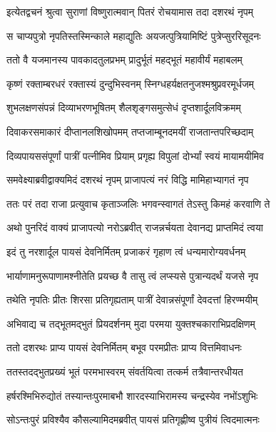 \twolineshloka
{इत्येतद्वचनं श्रुत्वा सुराणां विष्णुरात्मवान्}
{पितरं रोचयामास तदा दशरथं नृपम्} %

\twolineshloka
{स चाप्यपुत्रो नृपतिस्तस्मिन्काले महाद्युतिः}
{अयजत्पुत्रियामिष्टिं पुत्रेप्सुररिसूदनः} %

\twolineshloka
{ततो वै यजमानस्य पावकादतुलप्रभम्}
{प्रादुर्भूतं महद्भूतं महावीर्यं महाबलम्} %

\twolineshloka
{कृष्णं रक्ताम्बरधरं रक्तास्यं दुन्दुभिस्वनम्}
{स्निग्धहर्यक्षतनुजश्मश्रुप्रवरमूर्धजम्} %

\twolineshloka
{शुभलक्षणसंपन्नं दिव्याभरणभूषितम्}
{शैलशृङ्गसमुत्सेधं दृप्तशार्दूलविक्रमम्} %

\twolineshloka
{दिवाकरसमाकारं दीप्तानलशिखोपमम्}
{तप्तजाम्बूनदमयीं राजतान्तपरिच्छदाम्} %

\twolineshloka
{दिव्यपायससंपूर्णां पात्रीं पत्नीमिव प्रियाम्}
{प्रगृह्य विपुलां दोर्भ्यां स्वयं मायामयीमिव} %

\twolineshloka
{समवेक्ष्याब्रवीद्वाक्यमिदं दशरथं नृपम्}
{प्राजापत्यं नरं विद्धि मामिहाभ्यागतं नृप} %

\twolineshloka
{ततः परं तदा राजा प्रत्युवाच कृताञ्जलिः}
{भगवन्स्वागतं तेऽस्तु किमहं करवाणि ते} %

\twolineshloka
{अथो पुनरिदं वाक्यं प्राजापत्यो नरोऽब्रवीत्}
{राजन्नर्चयता देवानद्य प्राप्तमिदं त्वया} %

\twolineshloka
{इदं तु नरशार्दूल पायसं देवनिर्मितम्}
{प्रजाकरं गृहाण त्वं धन्यमारोग्यवर्धनम्} %

\twolineshloka
{भार्याणामनुरूपाणामश्नीतेति प्रयच्छ वै}
{तासु त्वं लप्स्यसे पुत्रान्यदर्थं यजसे नृप} %

\twolineshloka
{तथेति नृपतिः प्रीतः शिरसा प्रतिगृह्यताम्}
{पात्रीं देवान्नसंपूर्णां देवदत्तां हिरण्मयीम्} %

\twolineshloka
{अभिवाद्य च तद्भूतमद्भुतं प्रियदर्शनम्}
{मुदा परमया युक्तश्चकाराभिप्रदक्षिणम्} %

\twolineshloka
{ततो दशरथः प्राप्य पायसं देवनिर्मितम्}
{बभूव परमप्रीतः प्राप्य वित्तमिवाधनः} %

\twolineshloka
{ततस्तदद्भुतप्रख्यं भूतं परमभास्वरम्}
{संवर्तयित्वा तत्कर्म तत्रैवान्तरधीयत} %

\twolineshloka
{हर्षरश्मिभिरुद्योतं तस्यान्तःपुरमाबभौ}
{शारदस्याभिरामस्य चन्द्रस्येव नभोंऽशुभिः} %

\twolineshloka
{सोऽन्तःपुरं प्रविश्यैव कौसल्यामिदमब्रवीत्}
{पायसं प्रतिगृह्णीष्व पुत्रीयं त्विदमात्मनः} %

